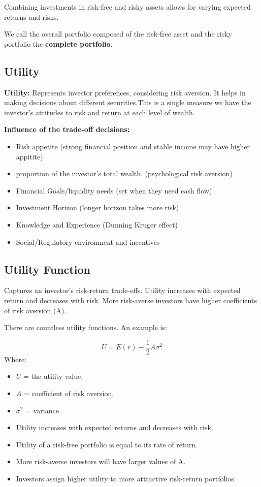 \documentclass[
]{book}
\providecommand{\tightlist}{%
  \setlength{\itemsep}{0pt}\setlength{\parskip}{0pt}}
\begin{document}
Combining investments in risk-free and risky assets allows for varying expected returns and risks.

We call the overall portfolio composed of the risk-free asset and the risky portfolio the \textbf{complete portfolio}.

\hypertarget{utility}{%
\subsection{Utility}\label{utility}}

\textbf{Utility:} Represents investor preferences, considering risk aversion. It helps in making decisions about different securities.This is a single measure we have the investor's attitudes to risk and return at each level of wealth.

\textbf{Influence of the trade-off decisions:}

\begin{itemize}
\tightlist
\item
  Risk appetite (strong financial position and stable income may have higher appitite)
\item
  proportion of the investor's total wealth. (psychological risk aversion)
\item
  Financial Goals/liquidity needs (set when they need cash flow)
\item
  Investment Horizon (longer horizon takes more risk)
\item
  Knowledge and Experience (Dunning Kruger effect)
\item
  Social/Regulatory environment and incentives
\end{itemize}

\hypertarget{utility-function}{%
\subsection{Utility Function}\label{utility-function}}

Captures an investor's risk-return trade-offs. Utility increases with expected return and decreases with risk. More risk-averse investors have higher coefficients of risk aversion (A).

There are countless utility functions. An example is:

\[
U = E(r) - \frac{1}{2} A \sigma^2
\]
Where:

\begin{itemize}
\tightlist
\item
  \(U\) = the utility value,
\item
  \(A\) = coefficient of risk aversion,
\item
  \(\sigma^2\) = variance
\item
  Utility increases with expected returns and decreases with risk.
\item
  Utility of a risk-free portfolio is equal to its rate of return.
\item
  More risk-averse investors will have larger values of A.
\item
  Investors assign higher utility to more attractive risk-return portfolios.
\end{itemize}
\end{document}
